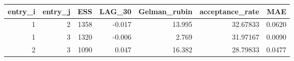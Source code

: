 \begin{longtable}{rrrrrrr}
\toprule
entry\_i & entry\_j & ESS & LAG\_30 & Gelman\_rubin & acceptance\_rate & MAE \\ 
\midrule
1 & 2 & 1358 & -0.017 & 13.995 & 32.67833 & 0.0620 \\ 
1 & 3 & 1320 & -0.006 & 2.769 & 31.97167 & 0.0090 \\ 
2 & 3 & 1090 & 0.047 & 16.382 & 28.79833 & 0.0477 \\ 
\bottomrule
\end{longtable}

